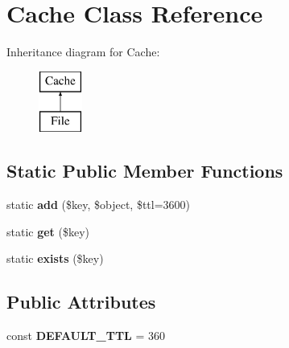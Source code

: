 \hypertarget{class_cache}{
\section{Cache Class Reference}
\label{class_cache}
}
Inheritance diagram for Cache:\begin{figure}[H]
\begin{center}
\leavevmode
\includegraphics[height=2.000000cm]{class_cache}
\end{center}
\end{figure}
\subsection*{Static Public Member Functions}
\begin{DoxyCompactItemize}
\item 
\hypertarget{class_cache_ae92a6032e401e97b9b88177a91142483}{
static {\bfseries add} (\$key, \$object, \$ttl=3600)}
\label{class_cache_ae92a6032e401e97b9b88177a91142483}

\item 
\hypertarget{class_cache_a70392b109331897bf9fdd7f1960e21de}{
static {\bfseries get} (\$key)}
\label{class_cache_a70392b109331897bf9fdd7f1960e21de}

\item 
\hypertarget{class_cache_a7c47b92e693bd277e4e018a54c8e8c44}{
static {\bfseries exists} (\$key)}
\label{class_cache_a7c47b92e693bd277e4e018a54c8e8c44}

\end{DoxyCompactItemize}
\subsection*{Public Attributes}
\begin{DoxyCompactItemize}
\item 
\hypertarget{class_cache_aa14742aadc324e3dbbe0c27833095d52}{
const {\bfseries DEFAULT\_\-TTL} = 360}
\label{class_cache_aa14742aadc324e3dbbe0c27833095d52}

\end{DoxyCompactItemize}
